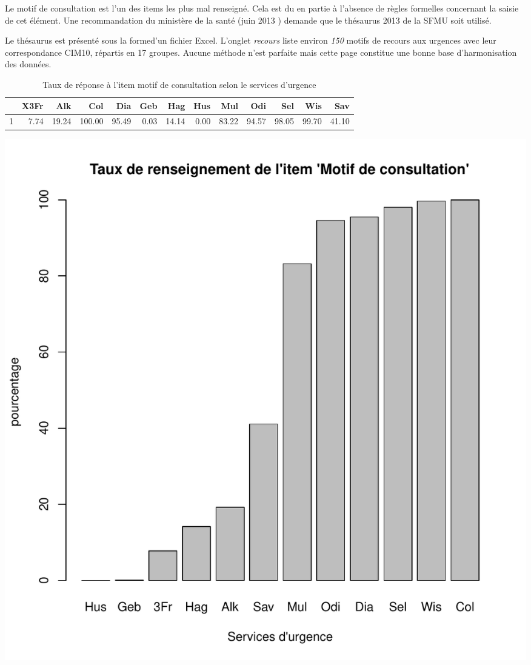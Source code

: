 \documentclass[12pt,english,french,twoside]{report}\usepackage[]{graphicx}\usepackage[]{color}
\makeatletter
\def\maxwidth{ %
  \ifdim\Gin@nat@width>\linewidth
    \linewidth
  \else
    \Gin@nat@width
  \fi
}
\makeatother
\begin{document}


Le motif de consultation est l'un des items les plus mal renseigné. Cela est du en partie à l'absence de règles formelles concernant la saisie de cet élément. Une recommandation du ministère de la santé (juin 2013 \cite{12,13}) demande que le thésaurus 2013 de la SFMU \cite{9} soit utilisé.

Le thésaurus est présenté sous la formed'un fichier Excel. L'onglet \emph{recours} liste environ \emph{150} motifs de recours aux urgences avec leur correspondance CIM10, répartis en 17 groupes. Aucune méthode n'est parfaite mais cette page constitue une bonne base d'harmonisation des données.


\begin{table}[ht]
\centering
\begin{tabular}{rrrrrrrrrrrrr}
  \hline
 & X3Fr & Alk & Col & Dia & Geb & Hag & Hus & Mul & Odi & Sel & Wis & Sav \\ 
  \hline
1 & 7.74 & 19.24 & 100.00 & 95.49 & 0.03 & 14.14 & 0.00 & 83.22 & 94.57 & 98.05 & 99.70 & 41.10 \\ 
   \hline
\end{tabular}
\caption[motif de consultation]{Taux de réponse à l'item motif de consultation selon le services d'urgence} 
\label{lab:motif}
\end{table}

\includegraphics[width=\maxwidth]{figure/motifss1} 
\end{document}
